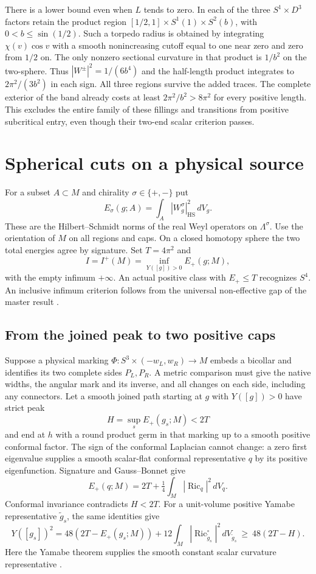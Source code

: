 \documentclass[11pt,letterpaper]{article}
\numberwithin{equation}{section}
\theoremstyle{remark}
\DeclareMathOperator{\Ric}{Ric}
\begin{document}
There is a lower bound even when \(L\) tends to zero. In each of the
three \(S^1\times D^3\) factors retain the product region
\([1/2,1]\times S^1(1)\times S^2(b)\), with
\(0<b\le\sin(1/2)\). Such a torpedo radius is obtained by
integrating \(\chi(v)\cos v\) with a smooth nonincreasing cutoff
equal to one near zero and zero from \(1/2\) on. The only nonzero
sectional curvature in that product is \(1/b^2\) on the two-sphere.
Thus \(|W^\pm|^2=1/(6b^4)\) and the half-length product integrates
to \(2\pi^2/(3b^2)\) in each sign. All three regions survive the
added traces. The complete exterior of the band already costs at
least \(2\pi^2/b^2>8\pi^2\) for every positive length. This excludes
the entire family of these fillings and transitions from positive
subcritical entry, even though their two-end scalar criterion passes.
\section{Spherical cuts on a physical source}\label{sec:budget}
For a subset \(A\subset M\) and chirality \(\sigma\in\{+,-\}\)
put
\[
 E_\sigma(g;A)=\int_A|W_g^\sigma|_{\mathrm{HS}}^2\,dV_g.
\]
These are the Hilbert--Schmidt norms of the real Weyl
operators on \(\Lambda^\sigma\). Use the orientation of
\(M\) on all regions and caps. On a closed homotopy sphere
the two total energies agree by signature.
Set \(T=4\pi^2\) and
\[
 I=I^+(M)=\inf_{Y([g])>0} E_+(g;M),
\]
with the empty infimum \(+\infty\).
An actual positive class with \(E_+\le T\) recognizes
\(S^4\). An inclusive infimum criterion follows from the
universal non-effective gap of the master result
\cite[Recognition and uniform recognition by the Weyl spectrum]{Baker2026ChiralMaster}
\cite{ChenZhu2014Conformal,Fu2018FourManifolds}.

\subsection{From the joined peak to two positive caps}
Suppose a physical marking
\(\Phi:S^3\times(-w_L,w_R)\to M\) embeds a bicollar and
identifies its two complete sides \(P_L,P_R\).
A metric comparison must give the native widths, the
angular mark and its inverse, and all changes on each
side, including any connectors. Let a smooth joined
path starting at \(g\) with \(Y([g])>0\) have strict peak
\[
 H=\sup_s E_+(g_s;M)<2T
\]
and end at \(h\) with a round product germ in that
marking up to a smooth positive conformal factor.
The sign of the conformal Laplacian cannot change:
a zero first eigenvalue supplies a smooth scalar-flat
conformal representative \(q\) by its positive
eigenfunction. Signature and Gauss--Bonnet give
\[
 E_+(q;M)=2T+\tfrac14\int_M|\Ric_q|^2\,dV_q .
\]
Conformal invariance contradicts \(H<2T\).
For a unit-volume positive Yamabe representative
\(\widetilde g_s\), the same identities give
\[
 Y([g_s])^2
 =48(2T-E_+(g_s;M))
      +12\int_M|\Ric^\circ_{\widetilde g_s}|^2\,dV_{\widetilde g_s}
 \ \ge\ 48(2T-H).
\]
Here the Yamabe theorem supplies the smooth constant
scalar curvature representative
\cite{Schoen1984Yamabe,LeeParker1987Yamabe}
\cite[Positive paths below the scalar-flat threshold and A short marked cut]{Baker2026FixedDescent}.
\end{document}
